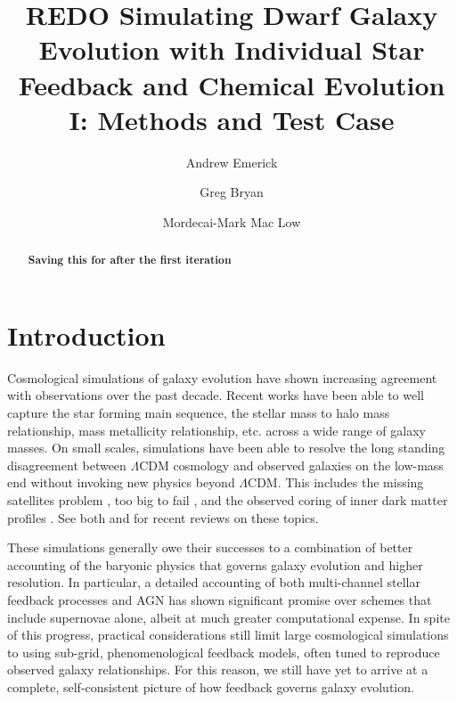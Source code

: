 \documentclass[twocolumn]{aastex61}
\begin{document}
\title{REDO Simulating Dwarf Galaxy Evolution with Individual Star Feedback and Chemical Evolution I: Methods and Test Case}
\author{Andrew Emerick}
\author{Greg Bryan}
\author{Mordecai-Mark Mac Low}


\begin{abstract}
\textbf{Saving this for after the first iteration}
\end{abstract}


\section{Introduction}

Cosmological simulations of galaxy evolution have shown increasing agreement with observations over the past decade. Recent works have been able to well capture the star forming main sequence, the stellar mass to halo mass relationship, mass metallicity relationship, etc. \citep[e.g.][]{EAGLE,Illustris1,Illustris2,FIRE,Dave2017} across a wide range of galaxy masses. On small scales, simulations have been able to resolve the long standing disagreement between $\Lambda$CDM cosmology and observed galaxies on the low-mass end without invoking new physics beyond $\Lambda$CDM. This includes the missing satellites problem \citep{Moore1999,Klypin1999}, too big to fail \citep{MBK2011,MBK2012,GK2014}, and the observed coring of inner dark matter profiles \citep[e.g.][]{Oh2011}. See both \citet{SomervilleDave2015} and \citet{NaabOstriker2016} for recent reviews on these topics. 

These simulations generally owe their successes to a combination of better accounting of the baryonic physics that governs galaxy evolution and higher resolution. In particular, a detailed accounting of both multi-channel stellar feedback processes and AGN has shown significant promise over schemes that include supernovae alone, albeit at much greater computational expense. In spite of this progress, practical considerations still limit large cosmological simulations to using sub-grid, phenomenological feedback models, often tuned to reproduce observed galaxy relationships. For this reason, we still have yet to arrive at a complete, self-consistent picture of how feedback governs galaxy evolution.
\end{document}
